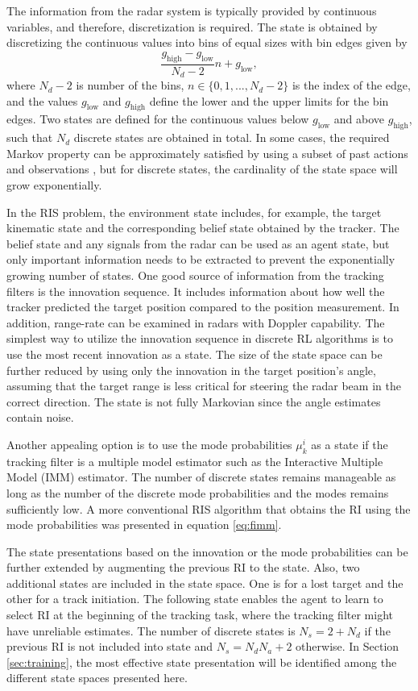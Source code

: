 \documentclass[english, 12pt, a4paper, elec, utf8, a-1b, online]{aaltothesis}
\newcommand{\glow}{g_\text{low}}
\newcommand{\ghigh}{g_\text{high}}
\newcommand{\modeprob}{\mu_k^i}
\begin{document}
The information from the radar system is typically provided by continuous variables, and therefore, discretization is required.
The state is obtained by discretizing the continuous values into bins of equal sizes with bin edges given by
\begin{equation}\label{eq:state_limits}
    \frac{\ghigh - \glow}{N_d - 2} n + \glow,
\end{equation}
where $N_d-2$ is number of the bins, $n \in \{0, 1, ..., N_d-2\}$ is the index of the edge, and
the values $\glow$ and $\ghigh$ define the lower and the upper limits for the bin edges.
Two states are defined for the continuous values below $\glow$ and above $\ghigh$, such that $N_d$ discrete states are obtained in total.
In some cases, the required Markov property can be approximately satisfied by using a subset of past actions and observations \cite{Mnih2013}, but for discrete states, the cardinality of the state space will grow exponentially.


In the RIS problem, 
the environment state includes, for example, the target kinematic state and the corresponding belief state obtained by the tracker. 
The belief state and any signals from the radar can be used as an agent state, but only important information needs to be extracted to prevent the exponentially growing number of states. 
One good source of information from the tracking filters is the innovation sequence. 
It includes information about how well the tracker predicted the target position compared to the position measurement. 
In addition, range-rate can be examined in radars with Doppler capability. 
The simplest way to utilize the innovation sequence in discrete RL algorithms is to use the most recent innovation as a state. 
The size of the state space can be further reduced by using only the innovation in the target position's angle, assuming that the target range is less critical for steering the radar beam in the correct direction.
The state is not fully Markovian since the angle estimates contain noise. 

Another appealing option is to use the mode probabilities $\modeprob$ as a state if the tracking filter is a multiple model estimator such as the Interactive Multiple Model (IMM) estimator. 
The number of discrete states remains manageable as long as the number of the discrete mode probabilities and the modes remains sufficiently low. 
A more conventional RIS algorithm that obtains the RI using the mode probabilities was presented in equation \eqref{eq:fimm}.

The state presentations based on the innovation or the mode probabilities can be further extended by augmenting the previous RI to the state.
Also, two additional states are included in the state space. 
One is for a lost target and the other for a track initiation.
The following state enables the agent to learn to select RI at the beginning of the tracking task, where the tracking filter might have unreliable estimates.
The number of discrete states is $N_s = 2+N_d$ if the previous RI is not included into state and $N_s = N_d N_a + 2$ otherwise.
In Section \ref{sec:training}, the most effective state presentation will be identified among the different state spaces presented here.
\end{document}
